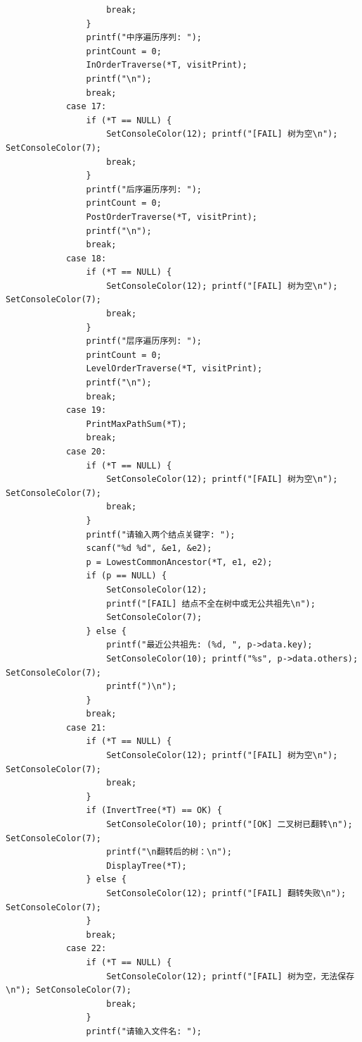 \documentclass[supercite]{Experimental_Report}
\begin{document}
{\begin{lstlisting}
                    break;
                }
                printf("中序遍历序列: ");
                printCount = 0;
                InOrderTraverse(*T, visitPrint);
                printf("\n");
                break;
            case 17:
                if (*T == NULL) {
                    SetConsoleColor(12); printf("[FAIL] 树为空\n"); SetConsoleColor(7);
                    break;
                }
                printf("后序遍历序列: ");
                printCount = 0;
                PostOrderTraverse(*T, visitPrint);
                printf("\n");
                break;
            case 18:
                if (*T == NULL) {
                    SetConsoleColor(12); printf("[FAIL] 树为空\n"); SetConsoleColor(7);
                    break;
                }
                printf("层序遍历序列: ");
                printCount = 0;
                LevelOrderTraverse(*T, visitPrint);
                printf("\n");
                break;
            case 19:
                PrintMaxPathSum(*T);
                break;
            case 20:
                if (*T == NULL) {
                    SetConsoleColor(12); printf("[FAIL] 树为空\n"); SetConsoleColor(7);
                    break;
                }
                printf("请输入两个结点关键字: ");
                scanf("%d %d", &e1, &e2);
                p = LowestCommonAncestor(*T, e1, e2);
                if (p == NULL) {
                    SetConsoleColor(12);
                    printf("[FAIL] 结点不全在树中或无公共祖先\n");
                    SetConsoleColor(7);
                } else {
                    printf("最近公共祖先: (%d, ", p->data.key);
                    SetConsoleColor(10); printf("%s", p->data.others); SetConsoleColor(7);
                    printf(")\n");
                }
                break;
            case 21:
                if (*T == NULL) {
                    SetConsoleColor(12); printf("[FAIL] 树为空\n"); SetConsoleColor(7);
                    break;
                }
                if (InvertTree(*T) == OK) {
                    SetConsoleColor(10); printf("[OK] 二叉树已翻转\n"); SetConsoleColor(7);
                    printf("\n翻转后的树：\n");
                    DisplayTree(*T);
                } else {
                    SetConsoleColor(12); printf("[FAIL] 翻转失败\n"); SetConsoleColor(7);
                }
                break;
            case 22:
                if (*T == NULL) {
                    SetConsoleColor(12); printf("[FAIL] 树为空，无法保存\n"); SetConsoleColor(7);
                    break;
                }
                printf("请输入文件名: ");

\end{lstlisting}}
\end{document}
